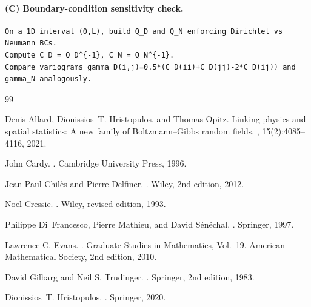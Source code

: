 \documentclass[11pt]{article}
\theoremstyle{definition}
\theoremstyle{plain}
\theoremstyle{remark}
\begin{document}
\paragraph{(C) Boundary-condition sensitivity check.}
\begin{lstlisting}
On a 1D interval (0,L), build Q_D and Q_N enforcing Dirichlet vs Neumann BCs.
Compute C_D = Q_D^{-1}, C_N = Q_N^{-1}.
Compare variograms gamma_D(i,j)=0.5*(C_D(ii)+C_D(jj)-2*C_D(ij)) and gamma_N analogously.
\end{lstlisting}

\begin{thebibliography}{99}

Denis Allard, Dionissios~T. Hristopulos, and Thomas Opitz.
\newblock Linking physics and spatial statistics: A new family of {B}oltzmann--{G}ibbs random fields.
, 15(2):4085--4116, 2021.

John Cardy.
.
\newblock Cambridge University Press, 1996.

Jean-Paul Chil{\`e}s and Pierre Delfiner.
.
\newblock Wiley, 2nd edition, 2012.

Noel Cressie.
.
\newblock Wiley, revised edition, 1993.

Philippe Di~Francesco, Pierre Mathieu, and David S{\'e}n{\'e}chal.
.
\newblock Springer, 1997.

Lawrence C. Evans.
.
\newblock Graduate Studies in Mathematics, Vol.~19. American Mathematical Society, 2nd edition, 2010.

David Gilbarg and Neil S. Trudinger.
.
\newblock Springer, 2nd edition, 1983.

Dionissios~T. Hristopulos.
.
\newblock Springer, 2020.


\end{thebibliography}
\end{document}
